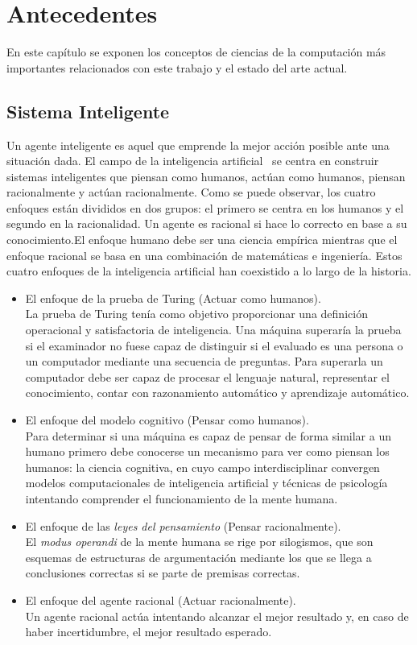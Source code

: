 \chapter{Antecedentes}
\label{cap:Antecedentes}
En este capítulo se exponen los conceptos de ciencias de la computación más importantes relacionados con este trabajo y el estado del arte actual.\\

\section{Sistema Inteligente}
Un agente inteligente es aquel que emprende la mejor acción posible ante una situación dada. El campo de la inteligencia artificial~\cite{Russ06} se centra en construir sistemas inteligentes que piensan como humanos, actúan como humanos, piensan racionalmente y actúan racionalmente. Como se puede observar, los cuatro enfoques están divididos en dos grupos: el primero se centra en los humanos y el segundo en la racionalidad. Un agente es racional si hace lo correcto en base a su conocimiento.El enfoque humano debe ser una ciencia empírica mientras que el enfoque racional se basa en una combinación de matemáticas e ingeniería. Estos cuatro enfoques de la inteligencia artificial han coexistido a lo largo de la historia.\\
\begin{itemize}
\item{El enfoque de la prueba de Turing (Actuar como humanos).}\\

  La prueba de Turing tenía como objetivo proporcionar una definición operacional y satisfactoria de inteligencia. Una máquina superaría la prueba si el examinador no fuese capaz de distinguir si el evaluado es una persona o un computador mediante una secuencia de preguntas. Para superarla un computador debe ser capaz de procesar el lenguaje natural, representar el conocimiento, contar con razonamiento automático y aprendizaje automático.
\item{El enfoque del modelo cognitivo (Pensar como humanos).}\\

Para determinar si una máquina es capaz de pensar de forma similar a un humano primero debe conocerse un mecanismo para ver como piensan los humanos: la ciencia cognitiva, en cuyo campo interdisciplinar convergen modelos computacionales de inteligencia artificial y técnicas de psicología intentando comprender el funcionamiento de la mente humana.
\item{El enfoque de las \textit{leyes del pensamiento} (Pensar racionalmente).}\\

  El \textit{modus operandi} de la mente humana se rige por silogismos, que son esquemas de estructuras de argumentación mediante los que se llega a conclusiones correctas si se parte de premisas correctas.
\item{El enfoque del agente racional (Actuar racionalmente).}\\

  Un agente racional actúa intentando alcanzar el mejor resultado y, en caso de haber incertidumbre, el mejor resultado esperado.
\end{itemize}
